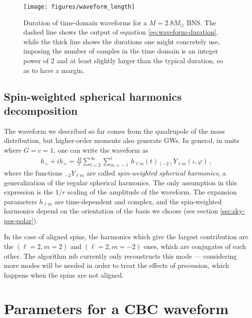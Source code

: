\documentclass[main.tex]{subfiles}
\begin{document}
\begin{figure}[ht]
\centering
\texttt{[image: figures/waveform\_length]}
\caption{Duration of time-domain waveforms for a \(M = 2.8 M_{\odot}\) \ac{BNS}. The dashed line shows the output of equation \eqref{eq:waveform-duration}, while the thick line shows the durations one might concretely use, imposing the number of samples in the time domain is an integer power of 2 and at least slightly larger than the typical duration, so as to have a margin.}
\label{fig:waveform_length}
\end{figure}

\subsection{Spin-weighted spherical harmonics decomposition} \label{sec:spherical-harmonics-decomposition}

The waveform we described so far comes from the quadrupole of the mass distribution, but higher-order moments also generate \acp{GW}.
In general, in units where \(G = c = 1\), one can write the waveform as \cite[eq.\ II.6]{ajithDataFormatsNumerical2011}
%
\begin{align}
h_+ + i h_\times = \frac{M}{r} \sum _{l=2}^{\infty } \sum _{m=-\ell}^{\ell} h_{\ell m} (t) {}_{(-2)}Y_{\ell m} (\iota, \varphi )
\,,
\end{align}
%
where the functions \({}_{-2}Y_{\ell m}\) are called \emph{spin-weighted spherical harmonics}, a generalization of the regular spherical harmonics. 
The only assumption in this expression is the \(1/r\) scaling of the amplitude of the waveform. 
The expansion parameters \(h_{\ell m}\) are time-dependent and complex, and the spin-weighted harmonics depend on the orientation of the basis we choose (see section \ref{sec:sky-pos-polar}).

In the case of aligned spins, the harmonics which give the largest contribution are the \((\ell = 2, m = 2)\) and \((\ell = 2, m =-2)\) ones, which are conjugates of each other. 
The algorithm \ac{mb} currently only reconstructs this mode ---
considering more modes will be needed in order to treat the effects of precession, which happens when the spins are not aligned. 


\section{Parameters for a \acs{CBC} waveform} \label{sec:cbc-parameters}
\end{document}
